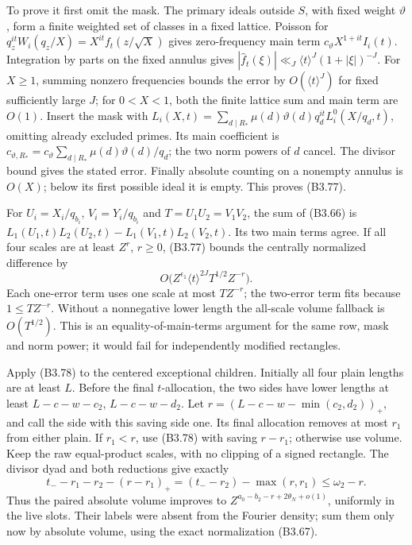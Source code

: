 \documentclass[11pt,a4paper]{article}
\begin{document}
To prove it first omit the mask. The primary ideals outside \(S\), with
fixed weight \(\vartheta\), form a finite weighted set of classes in a
fixed lattice. Poisson for \(q_z^{it}W_i(q_z/X)=X^{it}f_t(z/\sqrt X)\)
gives zero-frequency main term \(c_\vartheta X^{1+it}I_i(t)\).
Integration by parts on the fixed annulus gives
\(|\widehat f_t(\xi)|\ll_J\langle t\rangle^J(1+|\xi|)^{-J}\). For
\(X\ge1\), summing nonzero frequencies bounds the error by
\(O(\langle t\rangle^J)\) for fixed sufficiently large \(J\); for
\(0<X<1\), both the finite lattice sum and main term are \(O(1)\).
Insert the mask with
\(L_i(X,\allowbreak{}t)=\sum_{d\mid R_*}\mu(d)\vartheta(d)q_d^{it}L_i^0(X/q_d,\allowbreak{}t)\),
omitting already excluded primes. Its main coefficient is
\(c_{\vartheta,\allowbreak{}R_*}=c_\vartheta\sum_{d\mid R_*}\mu(d)\vartheta(d)/q_d\);
the two norm powers of \(d\) cancel. The divisor bound gives the stated
error. Finally absolute counting on a nonempty annulus is \(O(X)\);
below its first possible ideal it is empty. This proves (B3.77).

For \(U_i=X_i/q_{b_i}\), \(V_i=Y_i/q_{b_i}\) and \(T=U_1U_2=V_1V_2\),
the sum of (B3.66) is \(L_1(U_1,\allowbreak{}t)L_2(U_2,\allowbreak{}t)-L_1(V_1,\allowbreak{}t)L_2(V_2,\allowbreak{}t)\). Its
two main terms agree. If all four scales are at least \(Z^r\),
\(r\ge0\), (B3.77) bounds the centrally normalized difference by \[
O\bigl(Z^{\epsilon_1}\langle t\rangle^{2J}T^{1/2}Z^{-r}\bigr).
\tag{B3.78}
\] Each one-error term uses one scale at most \(TZ^{-r}\); the two-error
term fits because \(1\le TZ^{-r}\). Without a nonnegative lower length
the all-scale volume fallback is \(O(T^{1/2})\). This is an
equality-of-main-terms argument for the same row, mask and norm power;
it would fail for independently modified rectangles.

Apply (B3.78) to the centered exceptional children. Initially all four
plain lengths are at least \(L\). Before the final \(t\)-allocation, the
two sides have lower lengths at least \(L-c-w-c_2\), \(L-c-w-d_2\). Let
\(r=(L-c-w-\min(c_2,\allowbreak{}d_2))_+\), and call the side with this saving side
one. Its final allocation removes at most \(r_1\) from either plain. If
\(r_1<r\), use (B3.78) with saving \(r-r_1\); otherwise use volume. Keep
the raw equal-product scales, with no clipping of a signed rectangle.
The divisor dyad and both reductions give exactly \[
t_--r_1-r_2-(r-r_1)_+
=(t_--r_2)-\max(r,r_1)\le\omega_2-r.
\tag{B3.79}
\] Thus the paired absolute volume improves to
\(Z^{a_0-b_2-r+2\theta_N+o(1)}\), uniformly in the live slots. Their
labels were absent from the Fourier density; sum them only now by
absolute volume, using the exact normalization (B3.67).
\end{document}
